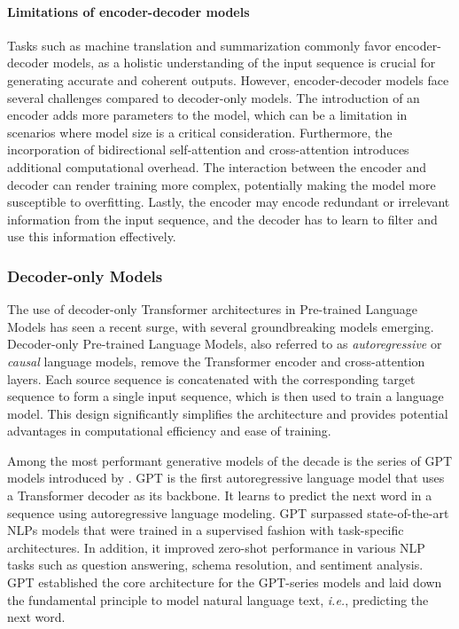 \paragraph{Limitations of encoder-decoder models} Tasks such as machine translation and summarization commonly favor encoder-decoder models, as  a holistic understanding of the input sequence is crucial for generating accurate and coherent outputs. However, encoder-decoder models face several challenges compared to decoder-only models. The introduction of an encoder adds more parameters to the model, which can be a limitation in scenarios where model size is a critical consideration. Furthermore, the incorporation of bidirectional self-attention and cross-attention introduces additional computational overhead. The interaction between the encoder and decoder can render training more complex, potentially making the model more susceptible to overfitting. Lastly, the encoder may encode redundant or irrelevant information from the input sequence, and the decoder has to learn to filter and use this information effectively.

\subsubsection{Decoder-only Models}

The use of decoder-only Transformer architectures in Pre-trained Language Models has seen a recent surge, with several groundbreaking models \citep{radford2018improving, brown2020language, ouyang2022training, touvron2023llama} emerging. Decoder-only Pre-trained Language Models, also referred to as \textit{autoregressive} or \textit{causal} language models, remove the Transformer encoder and cross-attention layers. Each source sequence is concatenated with the corresponding target sequence to form a single input sequence, which is then used to train a language model. This design significantly simplifies the architecture and provides potential advantages in computational efficiency and ease of training. 

Among the most performant generative models of the decade is the series of \ac{GPT} models introduced by \citep{radford2018improving}. \ac{GPT} is the first autoregressive language model that uses a Transformer decoder as its backbone. It learns to predict the next word in a sequence using autoregressive language modeling. \ac{GPT} surpassed state-of-the-art \acp{NLP} models that were trained in a supervised fashion with task-specific architectures. In addition, it improved zero-shot performance in various \ac{NLP} tasks such as question answering, schema resolution, and sentiment analysis. \ac{GPT} established the core architecture for the \ac{GPT}-series models and laid down the fundamental principle to model natural language text, \textit{i.e.}, predicting the next word.


